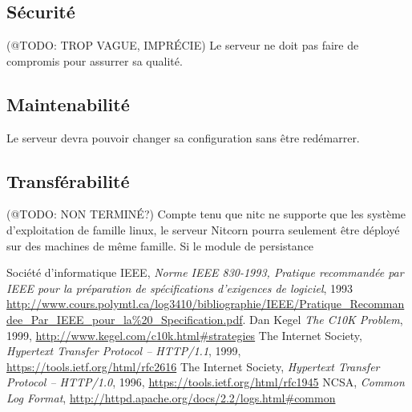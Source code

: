 \documentclass{scrreprt}
\begin{document}
\subsection{Sécurité}
(@TODO: TROP VAGUE, IMPRÉCIE)
Le serveur ne doit pas faire de compromis pour assurrer sa qualité.
\subsection{Maintenabilité}
Le serveur devra pouvoir changer sa configuration sans être redémarrer.
\subsection{Transférabilité} 
(@TODO: NON TERMINÉ?)
Compte tenu que nitc ne supporte que les système d'exploitation de famille linux, le serveur Nitcorn pourra seulement être déployé
sur des machines de même famille. Si le module de persistance 

\begin{thebibliography}{9}
  Société d'informatique IEEE,
\emph{Norme IEEE 830-1993, Pratique recommandée par IEEE pour la préparation de
spécifications d’exigences de logiciel}, 1993
\url{http://www.cours.polymtl.ca/log3410/bibliographie/IEEE/Pratique_Recommandee_Par_IEEE_pour_la%20_Specification.pdf}.
  Dan Kegel
\emph{The C10K Problem}, 1999, \url{http://www.kegel.com/c10k.html#strategies}
    The Internet Society,
\emph{Hypertext Transfer Protocol -- HTTP/1.1}, 1999,
\url{https://tools.ietf.org/html/rfc2616}
    The Internet Society,
\emph{Hypertext Transfer Protocol -- HTTP/1.0}, 1996,
\url{https://tools.ietf.org/html/rfc1945}
	NCSA,
\emph{Common Log Format},
\url{http://httpd.apache.org/docs/2.2/logs.html#common}	
\end{thebibliography}

\end{document}
